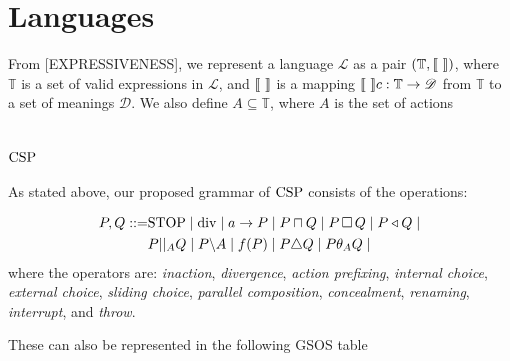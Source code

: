 \documentclass[../hons_project.tex]{subfiles}
\begin{document}
    
\section{Languages}\label{ssec:language}

From [EXPRESSIVENESS], we represent a language $\mathscr{L}$ as a pair $(\mathbb{T}, \llbracket \,\, \rrbracket)$, where $\mathbb{T}$ is a set of valid expressions in $\mathscr{L}$, and $\llbracket \,\, \rrbracket$ is a mapping $\llbracket \,\, \rrbracket c: \mathbb{T} \to \mathscr{D}$ from $\mathbb{T}$ to a set of meanings $\mathscr{D}$. We also define $A \subseteq \mathbb{T}$, where $A$ is the set of actions

\section{\texorpdfstring{$\mathrm{CSP}$}{CSP}}\label{ssec:CSP}
As stated above, our proposed grammar of $\mathrm{CSP}$ consists of the operations:

\begin{align*}
   P, Q ::= &\mathrm{STOP} \mid \mathrm{div} \mid a\to P \mid P \sqcap Q \mid P \,\square\, Q \mid P \triangleleft Q \mid \\
	&P | |_{A} Q \mid P \backslash A \mid f(P) \mid P \triangle Q \mid P \theta_{A} Q \mid 
\end{align*}
where the operators are: \textit{inaction}, \textit{divergence}, \textit{action prefixing}, \textit{internal choice}, \textit{external choice}, \textit{sliding choice}, \textit{parallel composition}, \textit{concealment}, \textit{renaming}, \textit{interrupt}, and \textit{throw}.

These can also be represented in the following GSOS table
\end{document}
